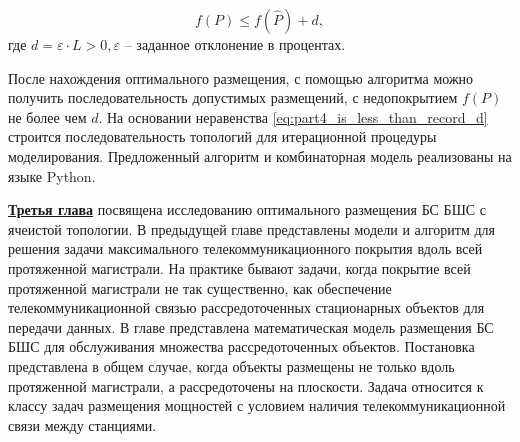 
\begin{equation}
    \label{eq:part4_is_less_than_record_d}
    f(P) \leqslant f(\widehat{P}) + d,
\end{equation}
где $d = \varepsilon \cdot L > 0, \varepsilon$ -- заданное отклонение в процентах.

 
После нахождения оптимального размещения, с помощью алгоритма можно получить последовательность допустимых размещений, с недопокрытием $f(P)$ не более чем $d$.  На основании неравенства \cref{eq:part4_is_less_than_record_d} строится последовательность топологий для итерационной процедуры моделирования. Предложенный алгоритм и комбинаторная модель реализованы на языке Python.




\underline{\textbf{Третья глава}} посвящена исследованию оптимального размещения БС БШС с ячеистой топологии. В предыдущей главе представлены модели и алгоритм для решения задачи максимального телекоммуникационного покрытия вдоль всей протяженной магистрали. На практике бывают задачи, когда покрытие всей протяженной магистрали не так существенно, как обеспечение телекоммуникационной связью  рассредоточенных стационарных объектов для передачи данных. В главе представлена математическая модель размещения БС БШС для обслуживания множества рассредоточенных объектов. Постановка представлена в общем случае, когда объекты размещены не только вдоль протяженной магистрали, а рассредоточены на плоскости. Задача относится к классу задач размещения мощностей с условием наличия телекоммуникационной связи между станциями.

